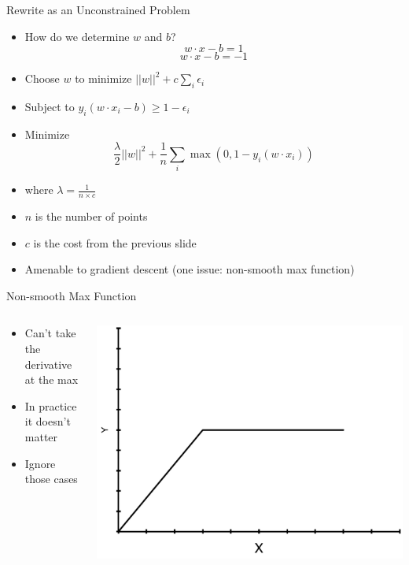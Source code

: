 \documentclass[aspectratio=169]{beamer}
\begin{document}
\begin{frame}{Rewrite as an Unconstrained Problem}

\begin{itemize}
\item How do we determine $w$ and $b$?
$$w \cdot x - b = 1$$ 
$$w \cdot x - b = -1$$ 
\item Choose $w$ to minimize $||w||^2 + c \sum_i \epsilon_i$
\item Subject to $y_i (w \cdot x_i - b) \geq 1 - \epsilon_i$

\item Minimize
	$$\frac{\lambda}{2}||w||^2 + \frac{1}{n} \sum_i \max(0, 1 - y_i (w \cdot x_i))$$
	\item where $\lambda = \frac{1}{n \times c}$
	\item $n$ is the number of points
	\item $c$ is the cost from the previous slide
	\item Amenable to gradient descent (one issue: non-smooth max function)
\end{itemize}
\end{frame}
\begin{frame}{Non-smooth Max Function}

\begin{columns}
\begin{column}{0.6\textwidth}
\begin{itemize}
\item Can't take the derivative at the max
\item In practice it doesn't matter
\item Ignore those cases
\end{itemize}
\end{column}
\begin{column}{0.4\textwidth}
\includegraphics[width=1\textwidth]{lectSVM/maxF}
\end{column}
\end{columns}
\end{frame}
\end{document}
